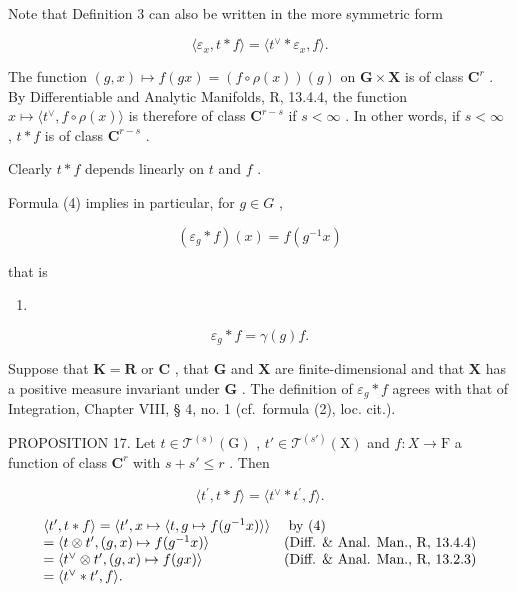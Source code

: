 Note that Definition 3 can also be written in the more symmetric form

\[
\langle \varepsilon_ {x}, t * f \rangle = \langle t ^ {\vee} * \varepsilon_ {x}, f \rangle .\tag{5}
\]

The function \((g,x)\mapsto f(gx) = (f\circ \rho (x))(g)\) on \(\mathbf{G}\times \mathbf{X}\) is of class \(\mathbf{C}^r\) . By Differentiable and Analytic Manifolds, R, 13.4.4, the function \(x\mapsto \langle t^\vee,f\circ \rho (x)\rangle\) is therefore of class \(\mathbf{C}^{r - s}\) if \(s < \infty\) . In other words, if \(s < \infty\) , \(t*f\) is of class \(\mathbf{C}^{r - s}\) .

Clearly \(t * f\) depends linearly on \(t\) and \(f\) .

Formula (4) implies in particular, for \(g \in G\) ,

\[
\left(\varepsilon_ {g} * f\right) (x) = f \left(g ^ {- 1} x\right)\tag{6}
\]

that is

\begin{enumerate}
\def\labelenumi{(\arabic{enumi})}
\setcounter{enumi}{6}
\tightlist
\item
\end{enumerate}

\[
\varepsilon_ {g} * f = \gamma (g) f.
\]

Suppose that \(\mathbf{K} = \mathbf{R}\) or \(\mathbf{C}\) , that \(\mathbf{G}\) and \(\mathbf{X}\) are finite-dimensional and that \(\mathbf{X}\) has a positive measure invariant under \(\mathbf{G}\) . The definition of \(\varepsilon_g * f\) agrees with that of Integration, Chapter VIII, § 4, no. 1 (cf.~formula (2), loc. cit.).

PROPOSITION 17. Let \(t \in \mathcal{T}^{(s)}(\mathrm{G})\) , \(t' \in \mathcal{T}^{(s')}(\mathrm{X})\) and \(f: X \to \mathrm{F}\) a function of class \(\mathbf{C}^{r}\) with \(s + s' \leqslant r\) . Then

\[
\langle t ^ {\prime}, t * f \rangle = \langle t ^ {\vee} * t ^ {\prime}, f \rangle .
\]

\[
\begin{array}{l l} \langle t ^ {\prime}, t * f \rangle = \langle t ^ {\prime}, x \mapsto \langle t, g \mapsto f (g ^ {- 1} x) \rangle \rangle & \text { by   (4) } \\ = \langle t \otimes t ^ {\prime}, (g, x) \mapsto f (g ^ {- 1} x) \rangle & \text {(Diff. \& Anal. Man., R, 13.4.4)} \\ = \langle t ^ {\vee} \otimes t ^ {\prime}, (g, x) \mapsto f (g x) \rangle & \text {(Diff. \& Anal. Man., R, 13.2.3)} \\ = \langle t ^ {\vee} * t ^ {\prime}, f \rangle . \end{array}
\]

